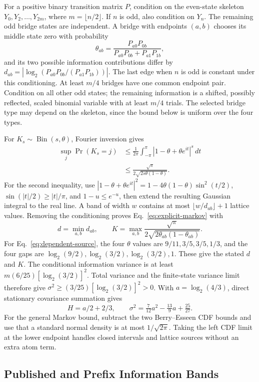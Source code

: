 For a positive binary transition matrix $P$, condition on the even-state
skeleton $Y_0,Y_2,\ldots,Y_{2m}$, where $m=\lfloor n/2\rfloor$. If $n$ is odd,
also condition on $Y_n$. The remaining odd bridge states are independent.
A bridge with endpoints $(a,b)$ chooses its middle state zero with probability
\[
 \theta_{ab}=\frac{P_{a0}P_{0b}}{P_{a0}P_{0b}+P_{a1}P_{1b}},
\]
and its two possible information contributions differ by
$d_{ab}=|\log_2(P_{a0}P_{0b}/(P_{a1}P_{1b}))|$. The last edge when $n$ is odd is
constant under this conditioning. At least $m/4$ bridges have one common
endpoint pair. Condition on all other odd states; the remaining information
is a shifted, possibly reflected, scaled binomial variable with at least
$m/4$ trials. The selected bridge type may depend on the skeleton, since the
bound below is uniform over the four types.

For $K_s\sim\operatorname{Bin}(s,\theta)$, Fourier inversion gives
\begin{align*}
 \sup_j\Pr(K_s=j)&\le\frac1{2\pi}
 \int_{-\pi}^{\pi}|1-\theta+\theta e^{it}|^s\,dt\\
 &\le\frac{\sqrt\pi}{2\sqrt{2s\theta(1-\theta)}}.
\end{align*}
For the second inequality, use
$|1-\theta+\theta e^{it}|^2=1-4\theta(1-\theta)\sin^2(t/2)$,
$\sin(|t|/2)\ge|t|/\pi$, and $1-u\le e^{-u}$, then extend the resulting
Gaussian integral to the real line. A band of width $w$ contains at most
$\lfloor w/d_{ab}\rfloor+1$ lattice values. Removing the conditioning proves
Eq.~\eqref{eq:explicit-markov} with
\[
 d=\min_{a,b}d_{ab},\qquad
 K=\max_{a,b}\frac{\sqrt\pi}{2\sqrt{2\theta_{ab}(1-\theta_{ab})}}.
\]
For Eq.~\eqref{eq:dependent-source}, the four $\theta$ values are
$9/11,3/5,3/5,1/3$, and the four gaps are
$\log_2(9/2),\log_2(3/2),\log_2(3/2),1$. These give the stated $d$ and $K$.
The conditional information variance is at least
$m(6/25)[\log_2(3/2)]^2$. Total variance and the finite-state variance limit
therefore give $\sigma^2\ge(3/25)[\log_2(3/2)]^2>0$.
With $a=\log_2(4/3)$, direct stationary covariance summation gives
\[
 H=a/2+2/3,\qquad
 \sigma^2=\tfrac7{12}a^2-\tfrac{13}{9}a+\tfrac{25}{27}.
\]
For the general Markov bound, subtract the two Berry--Esseen CDF bounds and
use that a standard normal density is at most $1/\sqrt{2\pi}$. Taking the
left CDF limit at the lower endpoint handles closed intervals and lattice
sources without an extra atom term.

\subsection{Published and Prefix Information Bands}

